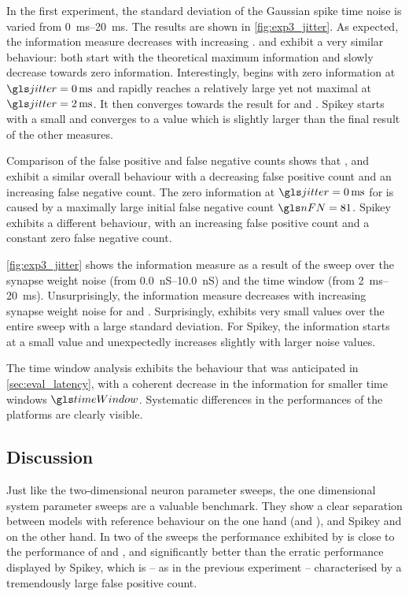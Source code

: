 In the first experiment, the standard deviation of the Gaussian spike time noise \jitter is varied from \SIrange{0}{20}{\milli\second}. The results are shown in \cref{fig:exp3_jitter}. As expected, the information measure decreases with increasing \jitter. \NEST and \NMMC exhibit a very similar behaviour: both start with the theoretical maximum information and slowly decrease towards zero information. Interestingly, \ESS begins with zero information at $\jitter = \SI{0}{\milli\second}$ and rapidly reaches a relatively large yet not maximal \info at $\jitter = \SI{2}{\milli\second}$. It then converges towards the result for \NEST and \NMMC. Spikey starts with a small \info and converges to a value which is slightly larger than the final result of the other measures.

Comparison of the false positive and false negative counts shows that \NEST, \NMMC and \ESS exhibit a similar overall behaviour with a decreasing false positive count and an increasing false negative count. The zero information at $\jitter = \SI{0}{\milli\second}$ for \ESS is caused by a maximally large initial false negative count $\nFN = 81$. Spikey exhibits a different behaviour, with an increasing false positive count and a constant zero false negative count.

\cref{fig:exp3_jitter} shows the information measure as a result of the sweep over the synapse weight noise \jitterWSyn (from \SIrange{0.0}{10.0}{\nano\siemens}) and the time window \timeWindow (from \SIrange{2}{20}{\milli\second}). Unsurprisingly, the information measure decreases with increasing synapse weight noise for \NEST and \NMMC. Surprisingly, \ESS exhibits very small values over the entire sweep with a large standard deviation. For Spikey, the information starts at a small value and unexpectedly increases slightly with larger noise values. 

The time window analysis exhibits the behaviour that was anticipated in \cref{sec:eval_latency}, with a coherent decrease in the information for smaller time windows $\timeWindow$. Systematic differences in the performances of the platforms are clearly visible.

\subsection{Discussion}
\label{sec:system_parameter_sweep_discussion}

Just like the two-dimensional neuron parameter sweeps, the one dimensional system parameter sweeps are a valuable benchmark. They show a clear separation between models with reference behaviour on the one hand (\NEST and \NMMC), and Spikey and \ESS on the other hand. In two of the sweeps the performance exhibited by \ESS is close to the performance of \NEST and \NMMC, and significantly better than the erratic performance displayed by Spikey, which is -- as in the previous experiment -- characterised by a tremendously large false positive count.

